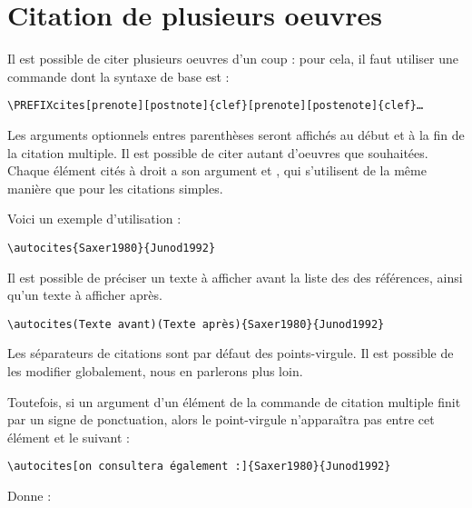 \section{Citation de plusieurs oeuvres}

Il est possible de citer plusieurs oeuvres d'un coup : pour cela, il faut utiliser une commande dont la syntaxe de base est :


\begin{verbatim}
\PREFIXcites[prenote][postnote]{clef}[prenote][postenote]{clef}…
\end{verbatim}

Les arguments optionnels entres parenthèses seront affichés au début et à la fin de la citation multiple. Il est possible de citer autant d'oeuvres que souhaitées. Chaque élément cités à droit a son argument  et , qui s'utilisent de la même manière que pour les citations simples.


Voici un exemple d'utilisation : 

\begin{verbatim}
\autocites{Saxer1980}{Junod1992}
\end{verbatim}

\begin{quotation}
\cites{Saxer1980}{Junod1992}
\end{quotation}
Il est possible de préciser un texte à afficher avant la liste des des références, ainsi qu'un texte à afficher après.

\begin{verbatim}
\autocites(Texte avant)(Texte après){Saxer1980}{Junod1992}
\end{verbatim}

Les séparateurs de citations sont par défaut des points-virgule. Il est possible de les modifier globalement, nous en parlerons plus loin.

Toutefois, si un argument  d'un élément de la commande de citation multiple finit par un signe de ponctuation, alors le point-virgule n'apparaîtra pas entre cet élément et le suivant :

\begin{verbatim}
\autocites[on consultera également :]{Saxer1980}{Junod1992}
\end{verbatim}

Donne :

\begin{quotation}
\cites[on consultera également :]{Saxer1980}{Junod1992}
\end{quotation}

